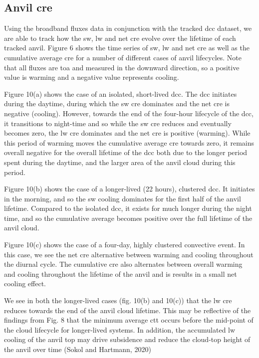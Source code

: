 \subsection{Anvil \acrshort{cre}}

Using the broadband fluxes data in conjunction with the tracked \acrshort{dcc}
dataset, we are able to track how the \acrshort{sw}, \acrshort{lw} and net \acrshort{cre} evolve over the
lifetime of each tracked anvil. Figure 6 shows the time series of \acrshort{sw}, \acrshort{lw}
and net \acrshort{cre} as well as the cumulative average \acrshort{cre} for a number of
different cases of anvil lifecycles. Note that all fluxes are
\acrshort{toa} and measured in the downward direction, so a positive
value is warming and a negative value represents cooling.

Figure 10(a) shows the case of an isolated, short-lived \acrshort{dcc}. The \acrshort{dcc}
initiates during the daytime, during which the \acrshort{sw} \acrshort{cre} dominates and the
net \acrshort{cre} is negative (cooling). However, towards the end of the four-hour
lifecycle of the \acrshort{dcc}, it transitions to night-time and so while the \acrshort{sw}
\acrshort{cre} reduces and eventually becomes zero, the \acrshort{lw} \acrshort{cre} dominates and the
net \acrshort{cre} is positive (warming). While this period of warming moves the
cumulative average \acrshort{cre} towards zero, it remains overall negative for the
overall lifetime of the \acrshort{dcc} both due to the longer period spent during
the daytime, and the larger area of the anvil cloud during this period.

Figure 10(b) shows the case of a longer-lived (22 hours), clustered \acrshort{dcc}.
It initiates in the morning, and so the \acrshort{sw} cooling dominates for the
first half of the anvil lifetime. Compared to the isolated \acrshort{dcc}, it
exists for much longer during the night time, and so the cumulative
average becomes positive over the full lifetime of the anvil cloud.

Figure 10(c) shows the case of a four-day, highly clustered convective
event. In this case, we see the net \acrshort{cre} alternative between warming and
cooling throughout the diurnal cycle. The cumulative \acrshort{cre} also alternates
between overall warming and cooling throughout the lifetime of the anvil
and is results in a small net cooling effect.

We see in both the longer-lived cases (fig. 10(b) and 10(c)) that the \acrshort{lw}
\acrshort{cre} reduces towards the end of the anvil cloud lifetime. This may be
reflective of the findings from Fig. 8 that the minimum average \acrshort{ctt}
occurs before the mid-point of the cloud lifecycle for longer-lived
systems. In addition, the accumulated \acrshort{lw} cooling of the anvil top may
drive subsidence and reduce the cloud-top height of the anvil over time
(Sokol and Hartmann, 2020)

